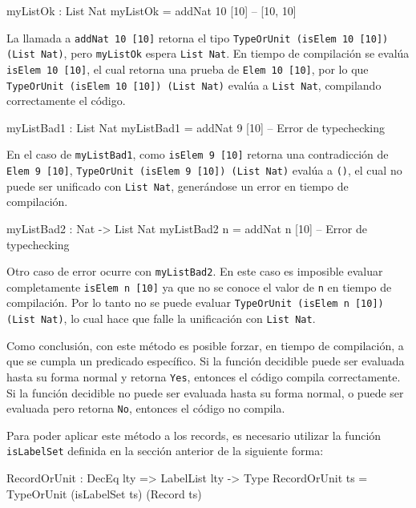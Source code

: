 \begin{code}
myListOk : List Nat
myListOk = addNat 10 [10] -- [10, 10]
\end{code}

La llamada a \texttt{addNat 10 [10]} retorna el tipo \texttt{TypeOrUnit (isElem 10 [10]) (List Nat)}, pero \texttt{myListOk} espera \texttt{List Nat}. En tiempo de compilación se evalúa \texttt{isElem 10 [10]}, el cual retorna una prueba de \texttt{Elem 10 [10]}, por lo que \texttt{TypeOrUnit (isElem 10 [10]) (List Nat)} evalúa a \texttt{List Nat}, compilando correctamente el código.

\begin{code}
myListBad1 : List Nat
myListBad1 = addNat 9 [10] -- Error de typechecking
\end{code}

En el caso de \texttt{myListBad1}, como \texttt{isElem 9 [10]} retorna una contradicción de \texttt{Elem 9 [10]}, \texttt{TypeOrUnit (isElem 9 [10]) (List Nat)} evalúa a \texttt{()}, el cual no puede ser unificado con \texttt{List Nat}, generándose un error en tiempo de compilación.

\begin{code}
myListBad2 : Nat -> List Nat
myListBad2 n = addNat n [10] -- Error de typechecking
\end{code}

Otro caso de error ocurre con \texttt{myListBad2}. En este caso es imposible evaluar completamente \texttt{isElem n [10]} ya que no se conoce el valor de \texttt{n} en tiempo de compilación. Por lo tanto no se puede evaluar \texttt{TypeOrUnit (isElem n [10]) (List Nat)}, lo cual hace que falle la unificación con \texttt{List Nat}.

Como conclusión, con este método es posible forzar, en tiempo de compilación, a que se cumpla un predicado específico. Si la función decidible puede ser evaluada hasta su forma normal y retorna \texttt{Yes}, entonces el código compila correctamente. Si la función decidible no puede ser evaluada hasta su forma normal, o puede ser evaluada pero retorna \texttt{No}, entonces el código no compila.

Para poder aplicar este método a los records, es necesario utilizar la función \texttt{isLabelSet} definida en la sección anterior de la siguiente forma:

\begin{code}
RecordOrUnit : DecEq lty => LabelList lty -> Type
RecordOrUnit ts = TypeOrUnit (isLabelSet ts) (Record ts)
\end{code}

